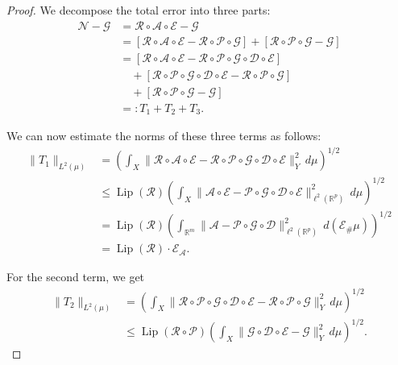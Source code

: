 \documentclass[10pt,a4paper]{amsart}
\newcommand{\Lip}{\operatorname{Lip}}
\newcommand{\RR}{\mathbb{R}}
\begin{document}
	\begin{proof}
		We decompose the total error into three parts:
		\begin{equation*}
			\begin{aligned}
				\mathscr{N} - \mathscr{G}
				&= \mathcal{R}\circ\mathcal{A}\circ\mathcal{E} - \mathscr{G} \\
				&= [\mathcal{R}\circ\mathcal{A}\circ\mathcal{E} - \mathcal{R}\circ\mathcal{P}\circ \mathscr{G}]
				+[\mathcal{R}\circ\mathcal{P}\circ \mathscr{G}-\mathscr{G}] \\
				&= [\mathcal{R}\circ\mathcal{A}\circ\mathcal{E} - \mathcal{R}\circ\mathcal{P}\circ \mathscr{G}\circ\mathcal{D}\circ\mathcal{E}] \\
				&\quad + [\mathcal{R}\circ\mathcal{P}\circ \mathscr{G}\circ\mathcal{D}\circ\mathcal{E} - \mathcal{R}\circ\mathcal{P}\circ \mathscr{G}] \\
				&\quad + [\mathcal{R}\circ\mathcal{P}\circ \mathscr{G} - \mathscr{G}] \\
				&=: T_1+T_2+T_3.
			\end{aligned}
		\end{equation*}
		
		We can now estimate the norms of these three terms as follows:
		\begin{equation*}
			\begin{aligned}
				\|T_1\|_{L^2(\mu)}
				&=
				\left(
				\int_X
				\|\mathcal{R}\circ\mathcal{A}\circ\mathcal{E}
				-
				\mathcal{R}\circ\mathcal{P}\circ \mathscr{G}\circ\mathcal{D}\circ\mathcal{E}\|_{Y}^{2}
				\,d\mu
				\right)^{1/2}\\
				&\leq
				\Lip(\mathcal{R})
				\left(
				\int_X
				\|\mathcal{A}\circ\mathcal{E}
				-
				\mathcal{P}\circ \mathscr{G}\circ\mathcal{D}\circ\mathcal{E}\|_{\ell^2(\RR^p)}^{2}
				\,d\mu
				\right)^{1/2}\\
				&=
				\Lip(\mathcal{R})
				\left(
				\int_{\RR^m}
				\|
				\mathcal{A}
				-
				\mathcal{P}\circ \mathscr{G}\circ\mathcal{D}
				\|_{\ell^2(\RR^p)}^{2}
				\,d(\mathcal{E}_{\#}\mu)
				\right)^{1/2}\\
				&=
				\Lip(\mathcal{R})\cdot \mathscr{E}_{\mathcal{A}}.
			\end{aligned}
		\end{equation*}
		
		For the second term, we get
		\begin{equation*}
			\begin{aligned}
				\|T_2\|_{L^2(\mu)}
				&=
				\left(
				\int_X
				\|
				\mathcal{R}\circ\mathcal{P}\circ \mathscr{G}\circ\mathcal{D}\circ\mathcal{E}
				-
				\mathcal{R}\circ\mathcal{P}\circ \mathscr{G}
				\|_{Y}^{2}
				\,d\mu
				\right)^{1/2}\\
				&\leq
				\Lip(\mathcal{R}\circ\mathcal{P})
				\left(
				\int_X
				\|
				\mathscr{G}\circ\mathcal{D}\circ\mathcal{E}
				-
				\mathscr{G}
				\|_{Y}^{2}
				\,d\mu
				\right)^{1/2}.
			\end{aligned}
		\end{equation*}
		

\end{proof}
\end{document}
